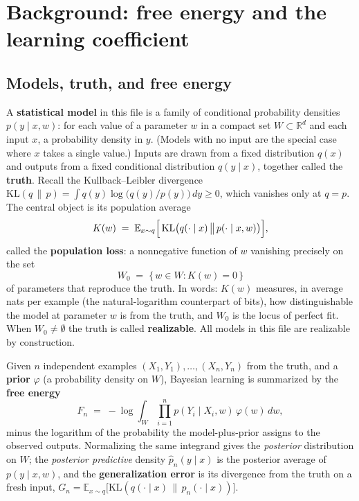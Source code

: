 \documentclass[11pt]{amsart}
\theoremstyle{plain}
\theoremstyle{definition}
\newcommand{\KL}{\mathrm{KL}}
\newcommand{\R}{\mathbb{R}}
\newcommand{\E}{\mathbb{E}}
\begin{document}
\section{Background: free energy and the learning coefficient}\label{sec:background}

\subsection{Models, truth, and free energy}\label{subsec:setup}

A \textbf{statistical model} in this file is a family of conditional probability densities $p(y \mid x, w)$: for each value of a parameter $w$ in a compact set $W \subset \R^d$ and each input $x$, a probability density in $y$. (Models with no input are the special case where $x$ takes a single value.) Inputs are drawn from a fixed distribution $q(x)$ and outputs from a fixed conditional distribution $q(y \mid x)$, together called the \textbf{truth}. Recall the Kullback--Leibler divergence $\KL(q\,\|\,p) = \int q(y)\log\bigl(q(y)/p(y)\bigr)\,dy \ge 0$, which vanishes only at $q = p$. The central object is its population average
\[
   K(w) \;=\; \E_{x \sim q}\Bigl[\, \KL\bigl(q(\cdot \mid x)\,\big\|\,p(\cdot \mid x, w)\bigr) \Bigr],
\]
called the \textbf{population loss}: a nonnegative function of $w$ vanishing precisely on the set
\[
   W_0 \;=\; \{\, w \in W : K(w) = 0 \,\}
\]
of parameters that reproduce the truth. In words: $K(w)$ measures, in average nats per example (the natural-logarithm counterpart of bits), how distinguishable the model at parameter $w$ is from the truth, and $W_0$ is the locus of perfect fit. When $W_0 \neq \emptyset$ the truth is called \textbf{realizable}. All models in this file are realizable by construction.

Given $n$ independent examples $(X_1,Y_1),\dots,(X_n,Y_n)$ from the truth, and a \textbf{prior} $\varphi$ (a probability density on $W$), Bayesian learning is summarized by the \textbf{free energy}
\[
   F_n \;=\; -\log \int_W \prod_{i=1}^n p(Y_i \mid X_i, w)\,\varphi(w)\,dw ,
\]
minus the logarithm of the probability the model-plus-prior assigns to the observed outputs. Normalizing the same integrand gives the \emph{posterior} distribution on $W$; the \emph{posterior predictive} density $\hat p_n(y \mid x)$ is the posterior average of $p(y \mid x, w)$, and the \textbf{generalization error} is its divergence from the truth on a fresh input,
$G_n = \E_{x\sim q}\bigl[\KL(q(\cdot \mid x)\,\|\,\hat p_n(\cdot \mid x))\bigr]$.
\end{document}
